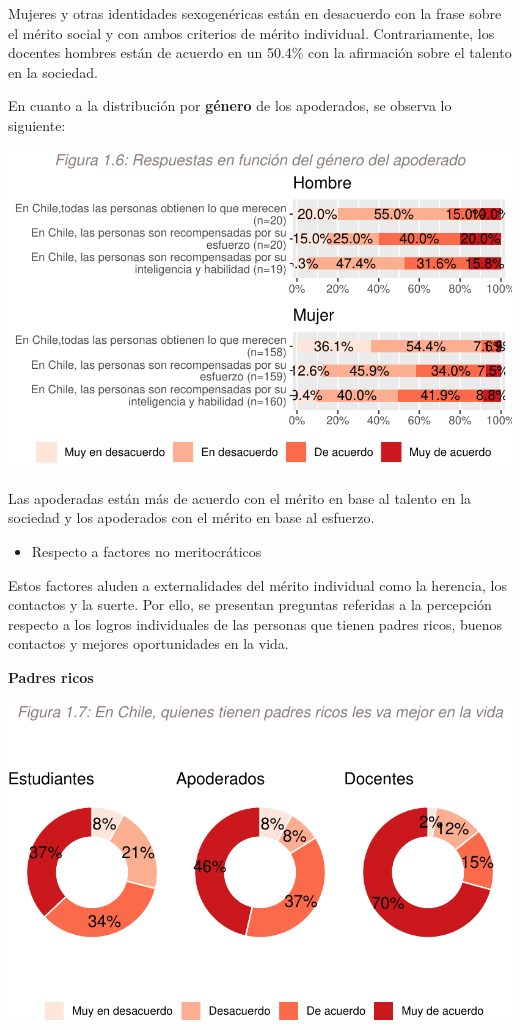 \documentclass[
  letterpaper,
  DIV=11,
  numbers=noendperiod]{scrartcl}
\providecommand{\tightlist}{%
  \setlength{\itemsep}{0pt}\setlength{\parskip}{0pt}}\usepackage{longtable,booktabs,array}
\begin{document}
Mujeres y otras identidades sexogenéricas están en desacuerdo con la
frase sobre el mérito social y con ambos criterios de mérito individual.
Contrariamente, los docentes hombres están de acuerdo en un 50.4\% con
la afirmación sobre el talento en la sociedad.

En cuanto a la distribución por \textbf{género} de los apoderados, se
observa lo siguiente:

\includegraphics{doc-colegios-con-profes-y-apoderados_files/figure-pdf/unnamed-chunk-15-1.pdf}

Las apoderadas están más de acuerdo con el mérito en base al talento en
la sociedad y los apoderados con el mérito en base al esfuerzo.

\begin{itemize}
\tightlist
\item
  Respecto a factores no meritocráticos
\end{itemize}

Estos factores aluden a externalidades del mérito individual como la
herencia, los contactos y la suerte. Por ello, se presentan preguntas
referidas a la percepción respecto a los logros individuales de las
personas que tienen padres ricos, buenos contactos y mejores
oportunidades en la vida.

\textbf{Padres ricos}

\includegraphics{doc-colegios-con-profes-y-apoderados_files/figure-pdf/unnamed-chunk-17-1.pdf}
\end{document}
